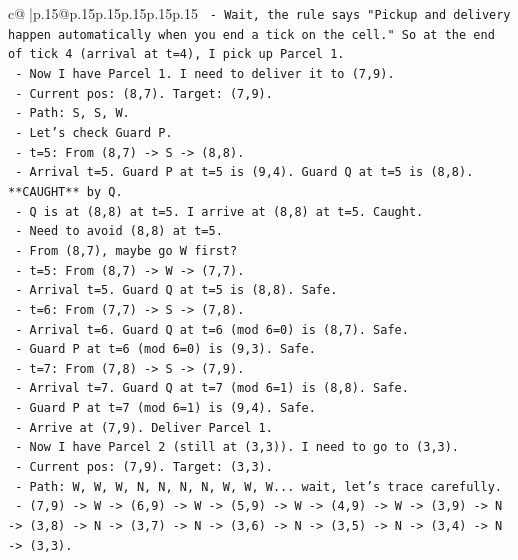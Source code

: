 \documentclass{article}
\begin{document}
{\begin{supertabular}{c@{$\;$}|p{.15\linewidth}@{}p{.15\linewidth}p{.15\linewidth}p{.15\linewidth}p{.15\linewidth}p{.15\linewidth}}
{{{\texttt{     {-} Wait, the rule says "Pickup and delivery happen automatically when you end a tick on the cell." So at the end of tick 4 (arrival at t=4), I pick up Parcel 1.} \\
\texttt{     {-} Now I have Parcel 1. I need to deliver it to (7,9).} \\
\texttt{     {-} Current pos: (8,7). Target: (7,9).} \\
\texttt{     {-} Path: S, S, W.} \\
\texttt{     {-} Let's check Guard P.} \\
\texttt{     {-} t=5: From (8,7) {-}> S {-}> (8,8).} \\
\texttt{       {-} Arrival t=5. Guard P at t=5 is (9,4). Guard Q at t=5 is (8,8). **CAUGHT** by Q.} \\
\texttt{       {-} Q is at (8,8) at t=5. I arrive at (8,8) at t=5. Caught.} \\
\texttt{     {-} Need to avoid (8,8) at t=5.} \\
\texttt{     {-} From (8,7), maybe go W first?} \\
\texttt{     {-} t=5: From (8,7) {-}> W {-}> (7,7).} \\
\texttt{       {-} Arrival t=5. Guard Q at t=5 is (8,8). Safe.} \\
\texttt{     {-} t=6: From (7,7) {-}> S {-}> (7,8).} \\
\texttt{       {-} Arrival t=6. Guard Q at t=6 (mod 6=0) is (8,7). Safe.} \\
\texttt{       {-} Guard P at t=6 (mod 6=0) is (9,3). Safe.} \\
\texttt{     {-} t=7: From (7,8) {-}> S {-}> (7,9).} \\
\texttt{       {-} Arrival t=7. Guard Q at t=7 (mod 6=1) is (8,8). Safe.} \\
\texttt{       {-} Guard P at t=7 (mod 6=1) is (9,4). Safe.} \\
\texttt{       {-} Arrive at (7,9). Deliver Parcel 1.} \\
\texttt{     {-} Now I have Parcel 2 (still at (3,3)). I need to go to (3,3).} \\
\texttt{     {-} Current pos: (7,9). Target: (3,3).} \\
\texttt{     {-} Path: W, W, W, N, N, N, N, W, W, W... wait, let's trace carefully.} \\
\texttt{     {-} (7,9) {-}> W {-}> (6,9) {-}> W {-}> (5,9) {-}> W {-}> (4,9) {-}> W {-}> (3,9) {-}> N {-}> (3,8) {-}> N {-}> (3,7) {-}> N {-}> (3,6) {-}> N {-}> (3,5) {-}> N {-}> (3,4) {-}> N {-}> (3,3).} \\
}}}
\end{supertabular}}
\end{document}
